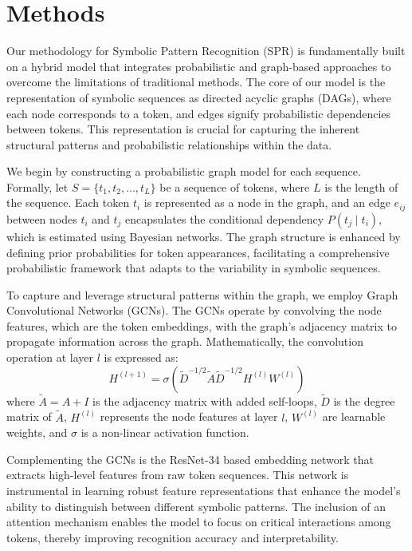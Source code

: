 \documentclass{article}
\begin{document}
\section{Methods}
Our methodology for Symbolic Pattern Recognition (SPR) is fundamentally built on a hybrid model that integrates probabilistic and graph-based approaches to overcome the limitations of traditional methods. The core of our model is the representation of symbolic sequences as directed acyclic graphs (DAGs), where each node corresponds to a token, and edges signify probabilistic dependencies between tokens. This representation is crucial for capturing the inherent structural patterns and probabilistic relationships within the data.

We begin by constructing a probabilistic graph model for each sequence. Formally, let \( S = \{t_1, t_2, \ldots, t_L\} \) be a sequence of tokens, where \( L \) is the length of the sequence. Each token \( t_i \) is represented as a node in the graph, and an edge \( e_{ij} \) between nodes \( t_i \) and \( t_j \) encapsulates the conditional dependency \( P(t_j \mid t_i) \), which is estimated using Bayesian networks. The graph structure is enhanced by defining prior probabilities for token appearances, facilitating a comprehensive probabilistic framework that adapts to the variability in symbolic sequences.

To capture and leverage structural patterns within the graph, we employ Graph Convolutional Networks (GCNs). The GCNs operate by convolving the node features, which are the token embeddings, with the graph's adjacency matrix to propagate information across the graph. Mathematically, the convolution operation at layer \( l \) is expressed as:
\[
H^{(l+1)} = \sigma\left( \tilde{D}^{-1/2} \tilde{A} \tilde{D}^{-1/2} H^{(l)} W^{(l)} \right)
\]
where \( \tilde{A} = A + I \) is the adjacency matrix with added self-loops, \( \tilde{D} \) is the degree matrix of \( \tilde{A} \), \( H^{(l)} \) represents the node features at layer \( l \), \( W^{(l)} \) are learnable weights, and \( \sigma \) is a non-linear activation function.

Complementing the GCNs is the ResNet-34 based embedding network that extracts high-level features from raw token sequences. This network is instrumental in learning robust feature representations that enhance the model's ability to distinguish between different symbolic patterns. The inclusion of an attention mechanism enables the model to focus on critical interactions among tokens, thereby improving recognition accuracy and interpretability.
\end{document}
